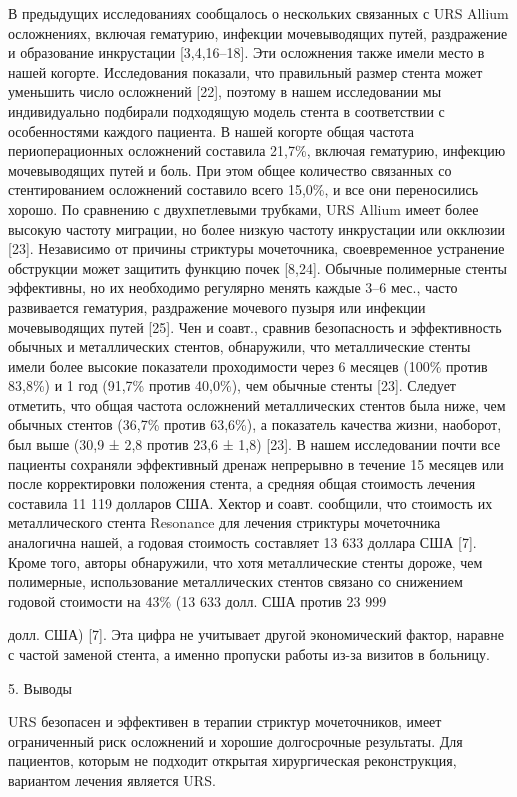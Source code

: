 В предыдущих исследованиях сообщалось о нескольких связанных с URS Allium осложнениях, включая гематурию, инфекции мочевыводящих путей, раздражение и образование инкрустации [3,4,16–18]. Эти осложнения также имели место в нашей когорте. Исследования показали, что правильный размер стента может уменьшить число осложнений [22], поэтому в нашем исследовании мы индивидуально подбирали подходящую модель стента в соответствии с особенностями каждого пациента. В нашей когорте общая частота периоперационных осложнений составила 21,7\%, включая гематурию, инфекцию мочевыводящих путей и боль. При этом общее количество связанных со стентированием осложнений составило всего 15,0\%, и все они переносились хорошо.
По сравнению с двухпетлевыми трубками, URS Allium имеет более высокую частоту миграции, но более низкую частоту инкрустации или окклюзии [23]. Независимо от причины стриктуры мочеточника, своевременное устранение обструкции может защитить функцию почек [8,24]. Обычные полимерные стенты эффективны, но их необходимо регулярно менять каждые 3–6 мес., часто развивается гематурия, раздражение мочевого пузыря или инфекции мочевыводящих путей [25]. Чен и соавт., сравнив безопасность и эффективность обычных и металлических стентов, обнаружили, что металлические стенты имели более высокие показатели проходимости через 6 месяцев (100\% против 83,8\%) и 1 год (91,7\% против 40,0\%), чем обычные стенты [23]. Следует отметить, что общая частота осложнений металлических стентов была ниже, чем обычных стентов (36,7\% против 63,6\%), а показатель качества жизни, наоборот, был выше (30,9 ± 2,8 против 23,6 ± 1,8) [23].
В нашем исследовании почти все пациенты сохраняли эффективный дренаж непрерывно в течение 15 месяцев или после корректировки положения стента, а средняя общая стоимость лечения составила 11 119 долларов США. Хектор и соавт. сообщили, что стоимость их металлического стента Resonance для лечения стриктуры мочеточника аналогична нашей, а годовая стоимость составляет 13 633 доллара США [7]. Кроме того, авторы обнаружили, что хотя металлические стенты дороже, чем полимерные, использование металлических стентов связано со снижением годовой стоимости на 43\% (13 633 долл. США против 23 999

долл. США) [7]. Эта цифра не учитывает другой экономический фактор, наравне с частой заменой стента, а именно пропуски работы из-за визитов в больницу.

5. Выводы

URS безопасен и эффективен в терапии стриктур мочеточников, имеет ограниченный риск осложнений и хорошие долгосрочные результаты. Для пациентов, которым не подходит открытая хирургическая реконструкция, вариантом лечения является URS.

